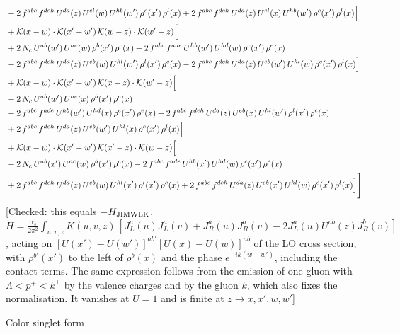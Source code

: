\documentclass[9pt]{article}
\numberwithin{equation}{section}
\begin{document}
\begin{align}
& -2\,f^{abc}\,f^{deh}\,U^{da}(z)\,U^{el}(w)\,U^{hb}(w')\,\rho^{c}(x')\,\rho^{l}(x) +2\,f^{abc}\,f^{deh}\,U^{da}(z)\,U^{el}(x)\,U^{hb}(w')\,\rho^{c}(x')\,\rho^{l}(x)\Big]\notag\\
& +\mathcal{K}(x-w)\cdot\mathcal{K}(x'-w')\,\mathcal{K}(w-z)\cdot\mathcal{K}(w'-z)\Big[\notag\\
& +2\,N_{c}\,U^{ab}(w')\,U^{ac}(w)\,\rho^{b}(x')\,\rho^{c}(x) +2\,f^{abc}\,f^{ade}\,U^{hb}(w')\,U^{hd}(w)\,\rho^{c}(x')\,\rho^{e}(x)\notag\\
& -2\,f^{abc}\,f^{deh}\,U^{da}(z)\,U^{eb}(w)\,U^{hl}(w')\,\rho^{l}(x')\,\rho^{c}(x) -2\,f^{abc}\,f^{deh}\,U^{da}(z)\,U^{eb}(w')\,U^{hl}(w)\,\rho^{c}(x')\,\rho^{l}(x)\Big]\notag\\
& +\mathcal{K}(x-w)\cdot\mathcal{K}(x'-w')\,\mathcal{K}(x-z)\cdot\mathcal{K}(w'-z)\Big[\notag\\
& -2\,N_{c}\,U^{ab}(w')\,U^{ac}(x)\,\rho^{b}(x')\,\rho^{c}(x)\notag\\
& -2\,f^{abc}\,f^{ade}\,U^{hb}(w')\,U^{hd}(x)\,\rho^{c}(x')\,\rho^{e}(x) +2\,f^{abc}\,f^{deh}\,U^{da}(z)\,U^{eb}(x)\,U^{hl}(w')\,\rho^{l}(x')\,\rho^{c}(x)\notag\\
& +2\,f^{abc}\,f^{deh}\,U^{da}(z)\,U^{eb}(w')\,U^{hl}(x)\,\rho^{c}(x')\,\rho^{l}(x)\Big]\notag\\
& +\mathcal{K}(x-w)\cdot\mathcal{K}(x'-w')\,\mathcal{K}(x'-z)\cdot\mathcal{K}(w-z)\Big[\notag\\
& -2\,N_{c}\,U^{ab}(x')\,U^{ac}(w)\,\rho^{b}(x')\,\rho^{c}(x) -2\,f^{abc}\,f^{ade}\,U^{hb}(x')\,U^{hd}(w)\,\rho^{c}(x')\,\rho^{e}(x)\notag\\
& +2\,f^{abc}\,f^{deh}\,U^{da}(z)\,U^{eb}(w)\,U^{hl}(x')\,\rho^{l}(x')\,\rho^{c}(x) +2\,f^{abc}\,f^{deh}\,U^{da}(z)\,U^{eb}(x')\,U^{hl}(w)\,\rho^{c}(x')\,\rho^{l}(x)\Big]\Bigg]
\end{align} {\color{red}[Checked: this equals $-H_{\rm JIMWLK}$, $H=\frac{\alpha_s}{2\pi^{2}}\int_{u,v,z}K(u,v,z)\,[J^{a}_{L}(u)J^{a}_{L}(v)+J^{a}_{R}(u)J^{a}_{R}(v)-2J^{a}_{L}(u)U^{ab}(z)J^{b}_{R}(v)]$, acting on $[U(x')-U(w')]^{ab'}[U(x)-U(w)]^{ab}$ of the LO cross section, with $\rho^{b'}(x')$ to the left of $\rho^{b}(x)$ and the phase $e^{-ik(w-w')}$, including the contact terms. The same expression follows from the emission of one gluon with $\Lambda<p^{+}<k^{+}$ by the valence charges and by the gluon $k$, which also fixes the normalisation. It vanishes at $U=1$ and is finite at $z\to x,x',w,w'$]}\par\noindent 
Color singlet form
\end{document}
